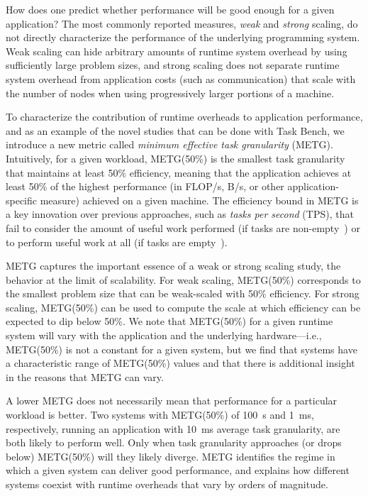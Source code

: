 How does one predict whether performance will be good enough for a given application?
The most commonly reported {\color{blue} measures},
\emph{weak} and \emph{strong} scaling, do not directly characterize
the performance of the underlying
programming system. Weak scaling can hide arbitrary amounts of runtime
system overhead by using sufficiently large problem sizes, and strong
scaling does not separate runtime system overhead from application costs
(such as communication) that scale with the number of nodes when
using progressively larger portions of a machine. 

To characterize the contribution of runtime overheads
to application performance, and as an example of the novel studies that can be done
with Task Bench, we introduce a new metric called
\emph{minimum effective task granularity} (METG). Intuitively, for a given
workload, METG(50\%) is the smallest task granularity that maintains
at least 50\% efficiency, meaning that the application achieves at
least 50\% of the highest performance (in FLOP/s, B/s, or other
application-specific measure) achieved on a given
machine. The efficiency bound in METG is a key innovation over
previous approaches, such as \emph{tasks per second} (TPS), that fail
to consider the amount of useful work performed (if tasks are
non-empty~\cite{Canary16, Armstrong14}) or to perform useful work at all (if tasks are empty~\cite{LegionTracing18}).

METG captures the important essence of a
weak or strong scaling study, the behavior at the limit of
scalability. For weak scaling, METG(50\%) corresponds to the
smallest problem size that can be weak-scaled with 50\%
efficiency. For strong scaling, METG(50\%) can be used to compute the
scale at which efficiency can be expected to dip below 50\%.
We note that METG(50\%) for a given runtime system will
vary with the application and the underlying hardware---i.e., METG(50\%)
is not a constant for a given system, but we find that systems have
a characteristic range of METG(50\%) values and that there is additional insight
in the reasons that METG can vary.

A lower METG does not necessarily mean that
performance for a particular workload is better. Two systems with METG(50\%) of 100~\textmu{}s and 1~ms,
respectively, running an application with 10~ms average task granularity, are both likely to perform well. Only when task
granularity approaches (or drops below) METG(50\%) will they
likely diverge. METG identifies the regime in which a
given system can deliver good performance, and explains how
different systems coexist with runtime overheads that vary by orders of magnitude.


